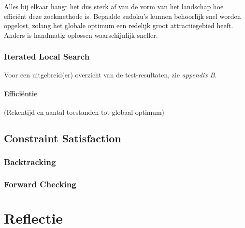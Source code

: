 \documentclass[]{report}
\begin{document}
Alles bij elkaar hangt het dus sterk af van de vorm van het landschap hoe effici\"{e}nt deze zoekmethode is. Bepaalde sudoku's kunnen behoorlijk snel worden opgelost, zolang het globale optimum een redelijk groot attractiegebied heeft. Anders is handmatig oplossen waarschijnlijk sneller.

\subsection{Iterated Local Search}
Voor een uitgebreid(er) overzicht van de test-resultaten, zie \textit{appendix B}.
\subsubsection{Effici\"{e}ntie}
(Rekentijd en aantal toestanden tot globaal optimum)
\section{Constraint Satisfaction}
\subsection{Backtracking}
\subsection{Forward Checking}

\chapter{Reflectie}
\end{document}

